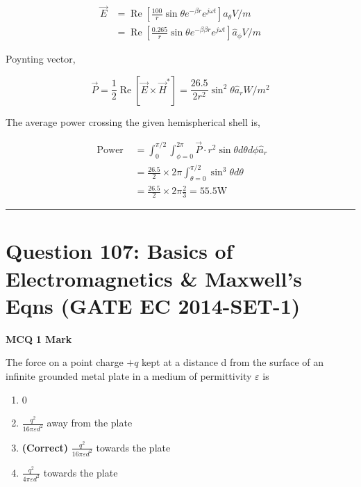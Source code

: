 \documentclass[11pt,a4paper]{article}
\begin{document}
\begin{tcolorbox}[solbox, title=Detailed Solution -- Question 106]
\[
\begin{aligned} \vec{E} &=\operatorname{Re}\left[\frac{100}{r} \sin \theta e^{-\beta r} e^{j \omega t}\right] \hat{a}_{\theta} V / m \\ &=\operatorname{Re}\left[\frac{0.265}{r} \sin \theta e^{-\beta \beta r} e^{j \omega t}\right] \hat{a}_{\phi} V / m \end{aligned}
\]

 Poynting vector,

\[
\vec{P}=\frac{1}{2} \operatorname{Re}\left[\vec{E} \times \vec{H}^{*}\right]=\frac{26.5}{2 r^{2}} \sin ^{2} \theta \hat{a}_{r} W / m^{2}
\]

 The average power crossing the given 
 hemispherical shell is,

\[
\begin{aligned} \text { Power } &=\int_{0}^{\pi / 2} \int_{\phi=0}^{2 \pi} \vec{P} \cdot r^{2} \sin \theta d \theta d \phi \hat{a}_{r} \\ &=\frac{26.5}{2} \times 2 \pi \int_{\theta=0}^{\pi / 2} \sin ^{3} \theta d \theta \\ &=\frac{26.5}{2} \times 2 \pi \frac{2}{3}=55.5 \mathrm{W} \end{aligned}
\]
\end{tcolorbox}

\vspace{1.5em}
\hrule
\vspace{1.5em}

\section*{Question 107: Basics of Electromagnetics \& Maxwell's Eqns (GATE EC 2014-SET-1)}
\noindent \textbf{\color{primary}MCQ} \hfill \textbf{\color{secondary}1 Mark}


\noindent The force on a point charge $+q$ kept at a distance d from the surface of an
infinite grounded metal plate in a medium of permittivity $\varepsilon$
is


\begin{enumerate}[label=(\Alph*)]
    \item 0
    \item $\frac{q^{2}}{16\pi \varepsilon d^{2}}$ away from the plate
    \item \textbf{(Correct)} $\frac{q^{2}}{16\pi \varepsilon d^{2}}$ towards the plate
    \item $\frac{q^{2}}{4\pi \varepsilon d^{2}}$ towards the plate
\end{enumerate}
\end{document}
